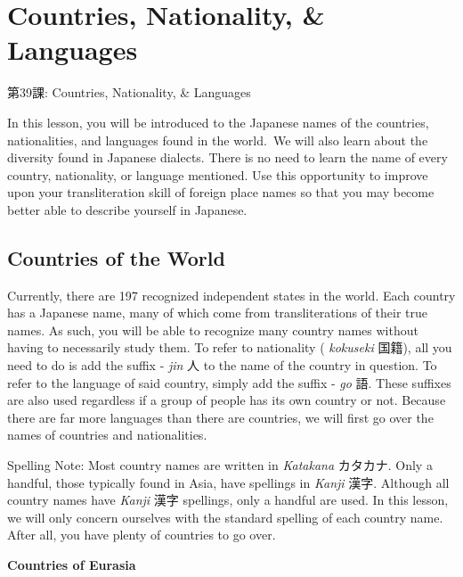     
\chapter{Countries, Nationality, \& Languages}

\begin{center}
\begin{Large}
第39課: Countries, Nationality, \& Languages 
\end{Large}
\end{center}
 
\par{ In this lesson, you will be introduced to the Japanese names of the countries, nationalities, and languages found in the world. We will also learn about the diversity found in Japanese dialects. There is no need to learn the name of every country, nationality, or language mentioned. Use this opportunity to improve upon your transliteration skill of foreign place names so that you may become better able to describe yourself in Japanese. }
      
\section{Countries of the World}
 
\par{ Currently, there are 197 recognized independent states in the world. Each country has a Japanese name, many of which come from transliterations of their true names. As such, you will be able to recognize many country names without having to necessarily study them. To refer to nationality ( \emph{kokuseki }国籍), all you need to do is add the suffix - \emph{jin }人 to the name of the country in question. To refer to the language of said country, simply add the suffix - \emph{go }語. These suffixes are also used regardless if a group of people has its own country or not. Because there are far more languages than there are countries, we will first go over the names of countries and nationalities. }

\par{ Spelling Note: Most country names are written in \emph{Katakana }カタカナ. Only a handful, those typically found in Asia, have spellings in \emph{Kanji }漢字. Although all country names have \emph{Kanji }漢字 spellings, only a handful are used. In this lesson, we will only concern ourselves with the standard spelling of each country name. After all, you have plenty of countries to go over. }

\begin{center}
\textbf{Countries of Eurasia }
\end{center}


